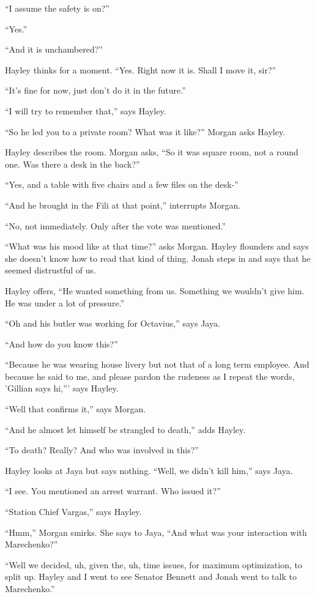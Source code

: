``I assume the safety is on?''

``Yes.''

``And it is unchambered?''

Hayley thinks for a moment.  ``Yes.  Right now it is.  Shall I move it, sir?''

``It's fine for now, just don't do it in the future.''

``I will try to remember that,'' says Hayley.

``So he led you to a private room?  What was it like?'' Morgan asks Hayley.

Hayley describes the room.  Morgan asks, ``So it was square room, not a round one.  Was there a desk in the back?''

``Yes, and a table with five chairs and a few files on the desk-''

``And he brought in the Fili at that point,'' interrupts Morgan.

``No, not immediately.  Only after the vote was mentioned.''

``What was his mood like at that time?'' asks Morgan.   Hayley flounders and says she doesn't know how to read that kind of thing.  Jonah steps in and says that he seemed distrustful of us.

Hayley offers, ``He wanted something from us.  Something we wouldn't give him.  He was under a lot of pressure.''

``Oh and his butler was working for Octavius,'' says Jaya.

``And how do you know this?''

``Because he was wearing house livery but not that of a long term employee.  And because he said to me, and please pardon the rudeness as I repeat the words, 'Gillian says hi,''' says Hayley.  

``Well that confirms it,'' says Morgan.

``And he almost let himself be strangled to death,'' adds Hayley.

``To death? Really? And who was involved in this?''

Hayley looks at Jaya but says nothing.  ``Well, we didn't kill him,'' says Jaya.

``I see.   You mentioned an arrest warrant.  Who issued it?''

``Station Chief Vargas,'' says Hayley.

``Hmm,'' Morgan smirks.  She says to Jaya, ``And what was your interaction with Marechenko?''

``Well we decided, uh, given the, uh, time issues, for maximum optimization, to split up.  Hayley and I went to see Senator Bennett and Jonah went to talk to Marechenko.''

